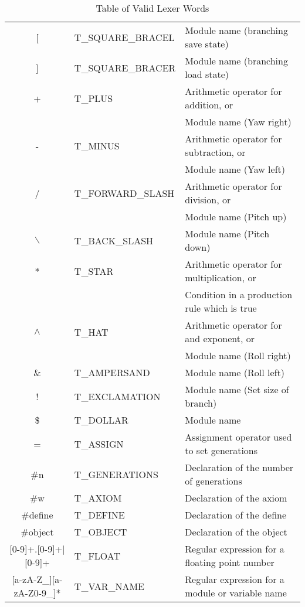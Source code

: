 \begin{table}[h!]
\begin{tabular}{  c | l | l }
	[ 				& T\_SQUARE\_BRACEL 	& Module name (branching save state) \\

	] 				& T\_SQUARE\_BRACER 	& Module name (branching load state) \\

	+ 				& T\_PLUS 				& Arithmetic operator for addition, or\\
					&						& Module name (Yaw right) \\

	- 				& T\_MINUS 				& Arithmetic operator for subtraction, or\\
					&						& Module name (Yaw left)\\

	/ 				& T\_FORWARD\_SLASH 	& Arithmetic operator for division, or\\
					&						& Module name (Pitch up)\\

	$\backslash$ 		& T\_BACK\_SLASH 		& Module name (Pitch down)\\

	* 				& T\_STAR 				& Arithmetic operator for multiplication, or\\
					&						& Condition in a production rule which is true\\

	$\land$		& T\_HAT 				& Arithmetic operator for and exponent, or\\
					&						& Module name (Roll right)\\

	$\&$ 			& T\_AMPERSAND 			& Module name (Roll left)\\

	! 				& T\_EXCLAMATION 		& Module name (Set size of branch)\\

	\$ 				& T\_DOLLAR 			& Module name \\

	= 				& T\_ASSIGN 			& Assignment operator used to set generations\\

	\#n 			& T\_GENERATIONS 		& Declaration of the number of generations\\

	\#w 			& T\_AXIOM 				& Declaration of the axiom\\

	\#define 			& T\_DEFINE 		& Declaration of the define\\

	\#object 			& T\_OBJECT			& Declaration of the object\\

	[0-9]+.[0-9]+$|$[0-9]+ 					& T\_FLOAT 				& Regular expression for a floating point number\\

	[a-zA-Z\_][a-zA-Z0-9\_]*  				& T\_VAR\_NAME 			& Regular expression for a module or variable name\\
\end{tabular}
\caption{Table of Valid Lexer Words}
\label{lexer words}
\end{table}
\FloatBarrier

